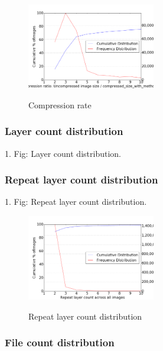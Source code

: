 \begin{figure}
	\centering
	\includegraphics[width=0.5\textwidth]{graphs/Compression_ratio_Uncompressed_image_size_divided_by_compressed_size_with_method_gzip.png}\\
	\caption{Compression rate}\label{fig_image_size_compression}
\end{figure}

\subsubsection{Layer count distribution}

1. Fig: Layer count distribution.


\subsubsection{Repeat layer count distribution}

1. Fig: Repeat layer count distribution.

\begin{figure}
	\centering
	\includegraphics[width=0.5\textwidth]{graphs/Repeat_layer_count_across_all_images}\\
	\caption{Repeat layer count distribution}\label{fig_image_size_compression}
\end{figure}

\subsubsection{File count distribution}

